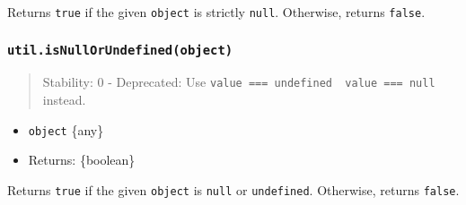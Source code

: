 Returns \texttt{true} if the given \texttt{object} is strictly
\texttt{null}. Otherwise, returns \texttt{false}.

\begin{Shaded}
\begin{Highlighting}[]
\OperatorTok{=} \NormalTok{(}\NormalTok{)}\OperatorTok{;}

\NormalTok{(}\NormalTok{)}\OperatorTok{;}
\NormalTok{(}\NormalTok{)}\OperatorTok{;}
\NormalTok{(}\NormalTok{)}\OperatorTok{;}
\end{Highlighting}
\end{Shaded}

\subsubsection{\texorpdfstring{\texttt{util.isNullOrUndefined(object)}}{util.isNullOrUndefined(object)}}\label{util.isnullorundefinedobject}

\begin{quote}
Stability: 0 - Deprecated: Use
\texttt{value\ ===\ undefined\ \textbar{}\textbar{}\ value\ ===\ null}
instead.
\end{quote}

\begin{itemize}
\tightlist
\item
  \texttt{object} \{any\}
\item
  Returns: \{boolean\}
\end{itemize}

Returns \texttt{true} if the given \texttt{object} is \texttt{null} or
\texttt{undefined}. Otherwise, returns \texttt{false}.

\begin{Shaded}
\begin{Highlighting}[]
\OperatorTok{=} \NormalTok{(}\NormalTok{)}\OperatorTok{;}

\NormalTok{(}\NormalTok{)}\OperatorTok{;}
\NormalTok{(}\NormalTok{)}\OperatorTok{;}
\NormalTok{(}\NormalTok{)}\OperatorTok{;}
\end{Highlighting}
\end{Shaded}

